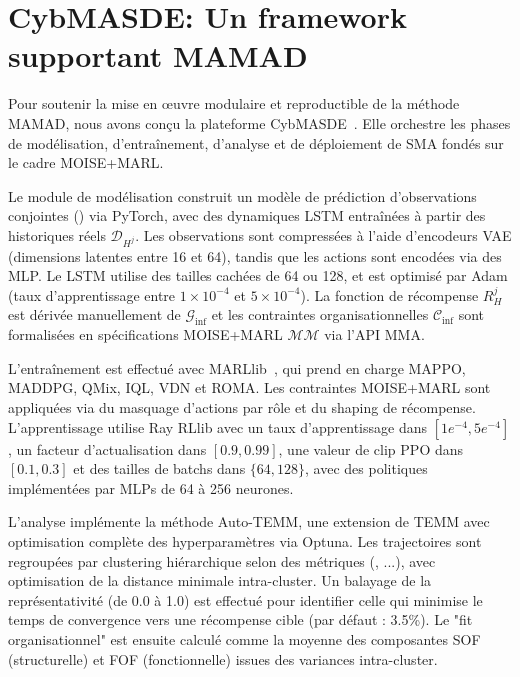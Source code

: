 \chapter{CybMASDE: Un framework supportant MAMAD}
\label{sec:cybmasde}

Pour soutenir la mise en œuvre modulaire et reproductible de la méthode \ac{MAMAD}, nous avons conçu la plateforme \ac{CybMASDE}~\footnotemark[1]. Elle orchestre les phases de modélisation, d'entraînement, d'analyse et de déploiement de \ac{SMA} fondés sur le cadre MOISE+MARL.


Le module de modélisation construit un modèle de prédiction d'observations conjointes () via PyTorch, avec des dynamiques \ac{LSTM} entraînées à partir des historiques réels $\mathcal{D}_{H^j}$. Les observations sont compressées à l'aide d'encodeurs \ac{VAE} (dimensions latentes entre 16 et 64), tandis que les actions sont encodées via des \ac{MLP}. Le \ac{LSTM} utilise des tailles cachées de 64 ou 128, et est optimisé par Adam (taux d'apprentissage entre $1 \times 10^{-4}$ et $5 \times 10^{-4}$). La fonction de récompense $R^j_H$ est dérivée manuellement de $\mathcal{G}_{\text{inf}}$ et les contraintes organisationnelles $\mathcal{C}_{\text{inf}}$ sont formalisées en spécifications MOISE+MARL $\mathcal{MM}$ via l'API \ac{MMA}.

L'entraînement est effectué avec MARLlib~\cite{hu2022marllib}, qui prend en charge \ac{MAPPO}, \ac{MADDPG}, \ac{QMix}, \ac{IQL}, \ac{VDN} et \ac{ROMA}. Les contraintes MOISE+MARL sont appliquées via du masquage d'actions par rôle et du shaping de récompense. L'apprentissage utilise Ray RLlib avec un taux d'apprentissage dans $[1e^{-4}, 5e^{-4}]$, un facteur d'actualisation dans $[0.9, 0.99]$, une valeur de clip \ac{PPO} dans $[0.1, 0.3]$ et des tailles de batchs dans $\{64, 128\}$, avec des politiques implémentées par \ac{MLP}s de 64 à 256 neurones.

L'analyse implémente la méthode Auto-TEMM, une extension de \ac{TEMM} avec optimisation complète des hyperparamètres via Optuna. Les trajectoires sont regroupées par clustering hiérarchique selon des métriques (, ...), avec optimisation de la distance minimale intra-cluster. Un balayage de la représentativité (de 0.0 à 1.0) est effectué pour identifier celle qui minimise le temps de convergence vers une récompense cible (par défaut : 3.5\%). Le "fit organisationnel" est ensuite calculé comme la moyenne des composantes \ac{SOF} (structurelle) et \ac{FOF} (fonctionnelle) issues des variances intra-cluster.

